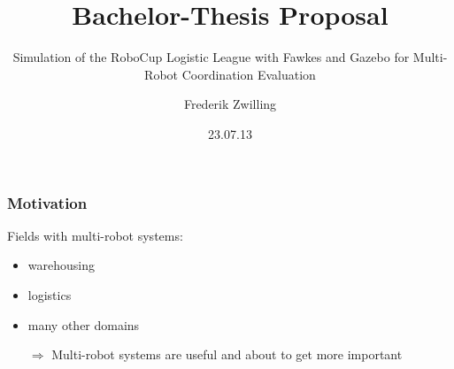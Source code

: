 \documentclass[]{beamer}
\title{Bachelor-Thesis Proposal}
\subtitle{Simulation of the RoboCup Logistic League with Fawkes and Gazebo for Multi-Robot Coordination Evaluation}
\author {Frederik Zwilling}
\institute{RWTH Aachen}
\date{23.07.13}
\begin{document}
\frame{\titlepage}


\begin{frame}
\frametitle{Motivation}
\begin{multicols}{2}
\begin{figure}
\end{figure}
Fields with multi-robot systems:
\begin{itemize}
\item<1-> warehousing
\item<2-> logistics
\item<3-> many other domains
\end{itemize}
\end{multicols}
\pause \pause \pause 
\begin{itemize}
\item[$\Rightarrow$] Multi-robot systems are useful and about to get more important
\end{itemize}
\end{frame}
\end{document}
